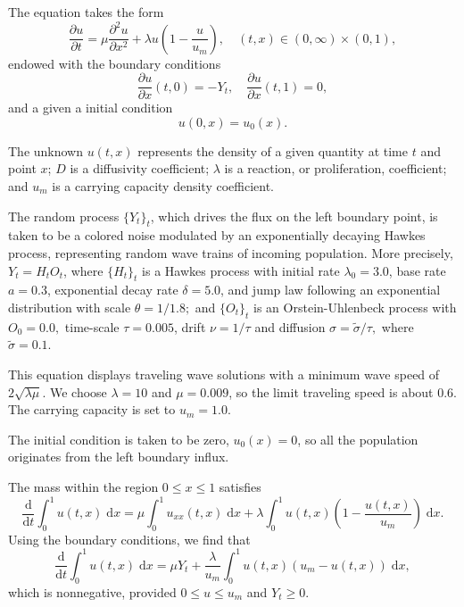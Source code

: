 \documentclass[reqno,12pt]{amsart}
\theoremstyle{plain} %
\theoremstyle{definition} %
\begin{document}
The equation takes the form
\begin{equation}
    \label{fisherkpprode}
    \frac{\partial u}{\displaystyle \partial t} = \mu\frac{\partial^2 u}{\partial x^2} + \lambda u\left(1 - \frac{u}{u_m}\right), \quad (t, x) \in (0, \infty) \times (0, 1),
\end{equation}
endowed with the boundary conditions
\begin{equation}
    \label{fisherkppbc}
    \frac{\partial u}{\partial x}(t, 0) = - Y_t, \quad \frac{\partial u}{\partial x}(t, 1) = 0,
\end{equation}
and a given a initial condition
\[
   u(0, x) = u_0(x).
\]

The unknown $u(t, x)$ represents the density of a given quantity at time $t$ and point $x$; $D$ is a diffusivity coefficient; $\lambda$ is a reaction, or proliferation, coefficient; and $u_m$ is a carrying capacity density coefficient.

The random process $\{Y_t\}_t$, which drives the flux on the left boundary point, is taken to be a colored noise modulated by an exponentially decaying Hawkes process, representing random wave trains of incoming population. More precisely, $Y_t = H_t O_t$, where $\{H_t\}_t$ is a Hawkes process with initial rate $\lambda_0 = 3.0$, base rate $a = 0.3$, exponential decay rate $\delta = 5.0$, and jump law following an exponential distribution with scale $\theta = 1/1.8;$ and $\{O_t\}_t$ is an Orstein-Uhlenbeck process with $O_0 = 0.0,$ time-scale $\tau = 0.005$, drift $\nu = 1/\tau$ and diffusion $\sigma = \tilde \sigma/\tau,$ where $\tilde\sigma = 0.1.$

This equation displays traveling wave solutions with a minimum wave speed of $2 \sqrt{\lambda \mu}$. We choose $\lambda = 10$ and $\mu= 0.009$, so the limit traveling speed is about $0.6$. The carrying capacity is set to $u_m = 1.0$.

The initial condition is taken to be zero, $u_0(x) = 0$, so all the population originates from the left boundary influx.

The mass within the region $0\leq x \leq 1$ satisfies
\[
   \frac{\mathrm{d}}{\mathrm{d} t} \int_0^1 u(t, x) \;\mathrm{d}x = \mu\int_0^1 u_{xx}(t, x) \;\mathrm{d}x + \lambda \int_0^1 u(t, x)\left(1 - \frac{u(t, x)}{u_m}\right)\;\mathrm{d}x.
\]
Using the boundary conditions, we find that
\[
   \frac{\mathrm{d}}{\mathrm{d}t} \int_0^1 u(t, x) \;\mathrm{d}x = \mu Y_t  + \frac{\lambda}{u_m} \int_0^1 u(t, x)\left(u_m - u(t, x)\right)\;\mathrm{d}x,
\]
which is nonnegative, provided $0 \leq u \leq u_m$ and $Y_t \geq 0$.
\end{document}
